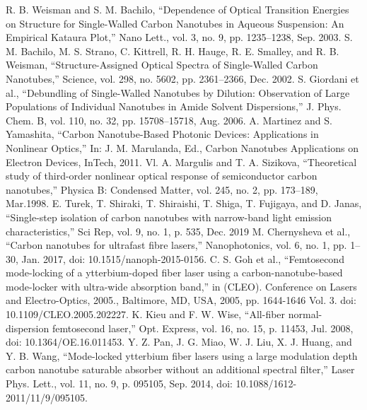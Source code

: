 \begin{thebibliography}{99}
 R. B. Weisman and S. M. Bachilo, “Dependence of Optical Transition Energies on Structure for Single-Walled Carbon Nanotubes in Aqueous Suspension: An Empirical Kataura Plot,” Nano Lett., vol. 3, no. 9, pp. 1235–1238, Sep. 2003.
 S. M. Bachilo, M. S. Strano, C. Kittrell, R. H. Hauge, R. E. Smalley, and R. B. Weisman, “Structure-Assigned Optical Spectra of Single-Walled Carbon Nanotubes,” Science, vol. 298, no. 5602, pp. 2361–2366, Dec. 2002. 
S. Giordani et al., “Debundling of Single-Walled Nanotubes by Dilution: Observation of Large Populations of Individual Nanotubes in Amide Solvent Dispersions,” J. Phys. Chem. B, vol. 110, no. 32, pp. 15708–15718, Aug. 2006.
 A. Martinez and S. Yamashita, “Carbon Nanotube-Based Photonic Devices: Applications in Nonlinear Optics,” In: J. M. Marulanda, Ed., Carbon Nanotubes Applications on Electron Devices, InTech, 2011. 
 Vl. A. Margulis and T. A. Sizikova, “Theoretical study of third-order nonlinear optical response of semiconductor carbon nanotubes,” Physica B: Condensed Matter, vol. 245, no. 2, pp. 173–189, Mar.1998.
 E. Turek, T. Shiraki, T. Shiraishi, T. Shiga, T. Fujigaya, and D. Janas, “Single-step isolation of carbon nanotubes with narrow-band light emission characteristics,” Sci Rep, vol. 9, no. 1, p. 535, Dec. 2019
 M. Chernysheva et al., “Carbon nanotubes for ultrafast fibre lasers,” Nanophotonics, vol. 6, no. 1, pp. 1–30, Jan. 2017, doi: 10.1515/nanoph-2015-0156.
 C. S. Goh et al., “Femtosecond mode-locking of a ytterbium-doped fiber laser using a carbon-nanotube-based mode-locker with ultra-wide absorption band,” in (CLEO). Conference on Lasers and Electro-Optics, 2005., Baltimore, MD, USA, 2005, pp. 1644-1646 Vol. 3. doi: 10.1109/CLEO.2005.202227.
 K. Kieu and F. W. Wise, “All-fiber normal-dispersion femtosecond laser,” Opt. Express, vol. 16, no. 15, p. 11453, Jul. 2008, doi: 10.1364/OE.16.011453.
 Y. Z. Pan, J. G. Miao, W. J. Liu, X. J. Huang, and Y. B. Wang, “Mode-locked ytterbium fiber lasers using a large modulation depth carbon nanotube saturable absorber without an additional spectral filter,” Laser Phys. Lett., vol. 11, no. 9, p. 095105, Sep. 2014, doi: 10.1088/1612-2011/11/9/095105.


\end{thebibliography}
